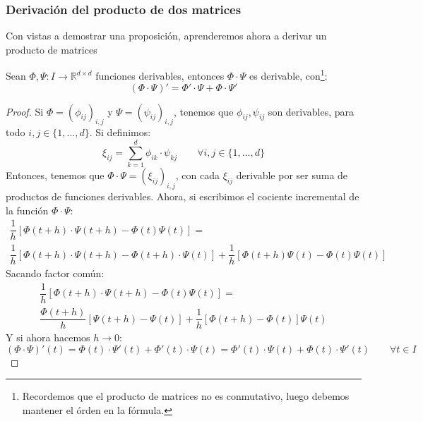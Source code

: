 \subsubsection{Derivación del producto de dos matrices}
Con vistas a demostrar una proposición, aprenderemos ahora a derivar un producto de matrices
\begin{lema}\label{lema:prop_deriv}
    Sean $\Phi,\Psi:I\rightarrow\mathbb{R}^{d\times d}$ funciones derivables, entonces $\Phi\cdot \Psi$ es derivable, con\footnote{Recordemos que el producto de matrices no es conmutativo, luego debemos mantener el órden en la fórmula.}:
    \begin{equation*}
        (\Phi\cdot \Psi)' = \Phi'\cdot \Psi + \Phi\cdot \Psi'
    \end{equation*}
    \begin{proof}
        Si $\Phi={(\phi_{ij})}_{i,j}$ y $\Psi={(\psi_{ij})}_{i,j}$, tenemos que $\phi_{ij},\psi_{ij}$ son derivables, para todo $i,j\in \{1,\ldots,d\}$. Si definimos:
        \begin{equation*}
            \xi_{ij} = \sum_{k=1}^d \phi_{ik}\cdot  \psi_{kj} \qquad \forall i,j \in \{1,\ldots,d\}
        \end{equation*}
        Entonces, tenemos que $\Phi\cdot \Psi = {(\xi_{ij})}_{i,j}$, con cada $\xi_{ij}$ derivable por ser suma de productos de funciones derivables. Ahora, si escribimos el cociente incremental de la función $\Phi\cdot \Psi$:
        \begin{multline*}
            \dfrac{1}{h}[\Phi(t+h)\cdot \Psi(t+h) - \Phi(t)\Psi(t)] =\\ \dfrac{1}{h} [\Phi(t+h)\cdot \Psi(t+h)-\Phi(t+h)\cdot \Psi(t)] + \dfrac{1}{h} [\Phi(t+h)\Psi(t)-\Phi(t)\Psi(t)]
        \end{multline*}
        Sacando factor común:
        \begin{multline*}
            \dfrac{1}{h}[\Phi(t+h)\cdot \Psi(t+h) - \Phi(t)\Psi(t)] =\\ \dfrac{\Phi(t+h)}{h} [\Psi(t+h)-\Psi(t)] + \dfrac{1}{h} [\Phi(t+h)-\Phi(t)] \Psi(t)
        \end{multline*}
        Y si ahora hacemos $h\rightarrow 0$:
        \begin{equation*}
            (\Phi\cdot \Psi)'(t) = \Phi(t)\cdot \Psi'(t) + \Phi'(t) \cdot \Psi(t) =  \Phi'(t)\cdot \Psi(t) +  \Phi(t) \cdot \Psi'(t)  \qquad \forall t\in I
        \end{equation*}
    \end{proof}
\end{lema}


